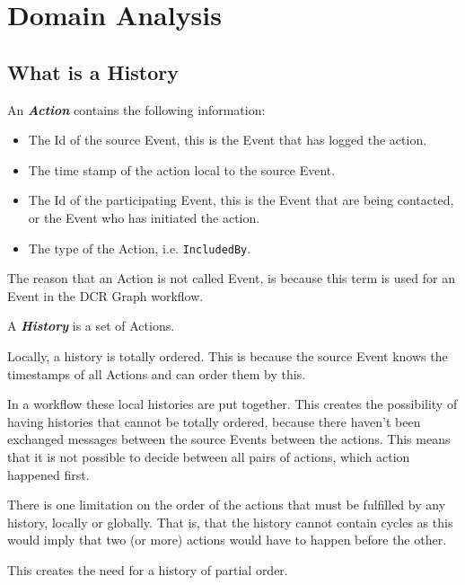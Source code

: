 \chapter{Domain Analysis}
\label{chap:domainanalysis}

\section{What is a History}
\begin{definition}
	An \textit{\textbf{Action}} contains the following information:
	\begin{itemize}
		\item The Id of the source Event, this is the Event that has logged the action.
		\item The time stamp of the action local to the source Event.
		\item The Id of the participating Event, this is the Event that are being contacted, or the Event who has initiated the action.
		\item The type of the Action, i.e. \texttt{IncludedBy}.
	\end{itemize}
	
	The reason that an Action is not called Event, is because this term is used for an Event in the DCR Graph workflow.
\end{definition}

\begin{definition}\label{definition:historya}
	A \textit{\textbf{History}} is a set of Actions.
\end{definition}

\begin{lemma}\label{lemma:partialorder}
	Locally, a history is totally ordered. This is because the source Event knows the timestamps of all Actions and can order them by this. 
	
	In a workflow these local histories are put together. This creates the possibility of having histories that cannot be totally ordered, because there haven't been exchanged messages between the source Events between the actions. This means that it is not possible to decide between all pairs of actions, which action happened first.
	
	There is one limitation on the order of the actions that must be fulfilled by any history, locally or globally. That is, that the history cannot contain cycles as this would imply that two (or more) actions would have to happen before the other.
	
	
	This creates the need for a history of partial order.
\end{lemma}

